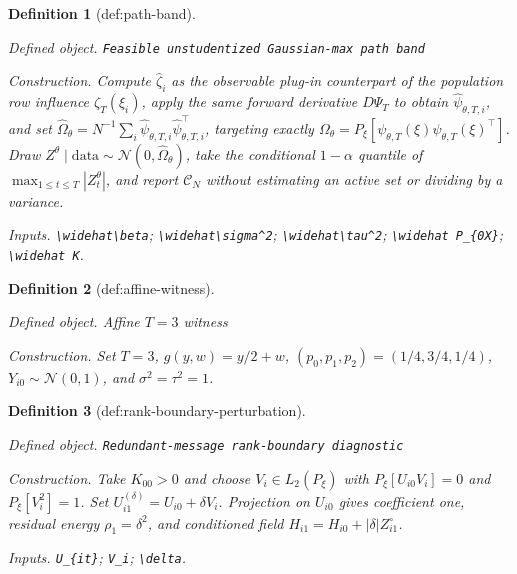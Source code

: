 \documentclass{article}
\newtheorem{definition}{Definition}
\begin{document}
\begin{definition}[def:path-band]\label{def:path-band}
\par\smallskip\noindent\emph{Defined object.} \texttt{Feasible unstudentized Gaussian-\allowbreak{}max path band}
\par\smallskip\noindent\emph{Construction.} Compute \(\widehat\zeta_i\) as the observable plug-in counterpart of the population row influence \(\zeta_T(\xi_i)\), apply the same forward derivative \(D\Psi_T\) to obtain \(\widehat\psi_{\theta,T,i}\), and set \(\widehat\Omega_\theta=N^{-1}\sum_i\widehat\psi_{\theta,T,i}\widehat\psi_{\theta,T,i}^{\top}\), targeting exactly \(\Omega_\theta=P_\xi[\psi_{\theta,T}(\xi)\psi_{\theta,T}(\xi)^{\top}]\). Draw \(Z^\theta\mid\text{data}\sim\mathcal N(0,\widehat\Omega_\theta)\), take the conditional \(1-\alpha\) quantile of \(\max_{1\le t\le T}|Z_t^\theta|\), and report \(\mathcal C_N\) without estimating an active set or dividing by a variance.
\par\smallskip\noindent\emph{Inputs.} \texttt{\textbackslash{}\allowbreak{}widehat\textbackslash{}\allowbreak{}beta}; \texttt{\textbackslash{}\allowbreak{}widehat\textbackslash{}\allowbreak{}sigma\textasciicircum{}2}; \texttt{\textbackslash{}\allowbreak{}widehat\textbackslash{}\allowbreak{}tau\textasciicircum{}2}; \texttt{\textbackslash{}\allowbreak{}widehat P\_\allowbreak{}\{0X\}\allowbreak{}}; \texttt{\textbackslash{}\allowbreak{}widehat K}.
\end{definition}

\begin{definition}[def:affine-witness]\label{def:affine-witness}
\par\smallskip\noindent\emph{Defined object.} Affine \(T=3\) witness
\par\smallskip\noindent\emph{Construction.} Set \(T=3\), \(g(y,w)=y/2+w\), \((p_0,p_1,p_2)=(1/4,3/4,1/4)\), \(Y_{i0}\sim\mathcal N(0,1)\), and \(\sigma^2=\tau^2=1\).
\end{definition}

\begin{definition}[def:rank-boundary-perturbation]\label{def:rank-boundary-perturbation}
\par\smallskip\noindent\emph{Defined object.} \texttt{Redundant-\allowbreak{}message rank-\allowbreak{}boundary diagnostic}
\par\smallskip\noindent\emph{Construction.} Take \(K_{00}>0\) and choose \(V_i\in L_2(P_\xi)\) with \(P_\xi[U_{i0}V_i]=0\) and \(P_\xi[V_i^2]=1\). Set \(U_{i1}^{(\delta)}=U_{i0}+\delta V_i\). Projection on \(U_{i0}\) gives coefficient one, residual energy \(\rho_1=\delta^2\), and conditioned field \(H_{i1}=H_{i0}+|\delta|Z_{i1}^{\circ}\).
\par\smallskip\noindent\emph{Inputs.} \texttt{U\_\allowbreak{}\{it\}\allowbreak{}}; \texttt{V\_\allowbreak{}i}; \texttt{\textbackslash{}\allowbreak{}delta}.
\end{definition}
\end{document}
